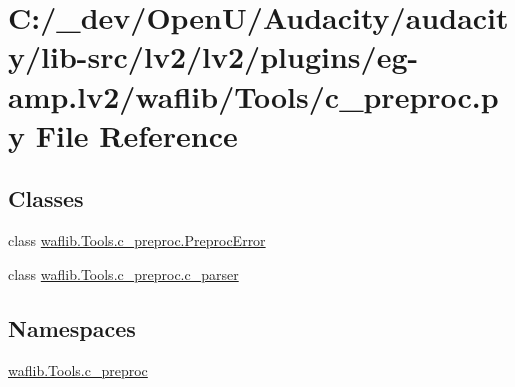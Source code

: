 \hypertarget{lv2_2plugins_2eg-amp_8lv2_2waflib_2_tools_2c__preproc_8py}{}\section{C\+:/\+\_\+dev/\+Open\+U/\+Audacity/audacity/lib-\/src/lv2/lv2/plugins/eg-\/amp.lv2/waflib/\+Tools/c\+\_\+preproc.py File Reference}
\label{lv2_2plugins_2eg-amp_8lv2_2waflib_2_tools_2c__preproc_8py}
\subsection*{Classes}
\begin{DoxyCompactItemize}
\item 
class \hyperlink{classwaflib_1_1_tools_1_1c__preproc_1_1_preproc_error}{waflib.\+Tools.\+c\+\_\+preproc.\+Preproc\+Error}
\item 
class \hyperlink{classwaflib_1_1_tools_1_1c__preproc_1_1c__parser}{waflib.\+Tools.\+c\+\_\+preproc.\+c\+\_\+parser}
\end{DoxyCompactItemize}
\subsection*{Namespaces}
\begin{DoxyCompactItemize}
\item 
 \hyperlink{namespacewaflib_1_1_tools_1_1c__preproc}{waflib.\+Tools.\+c\+\_\+preproc}
\end{DoxyCompactItemize}
